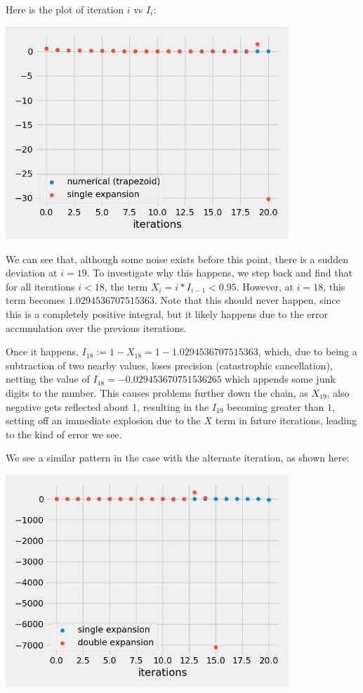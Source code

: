 Here is the plot of iteration $i$ vs $I_i$:

\begin{center}
	\includegraphics*[width=0.8\textwidth]{res/3.3-single.png}
\end{center}

We can see that, although some noise exists before this point, there is a sudden deviation at $i = 19$. To investigate why this happens, we step back and find that for all iterations $i < 18$, the term $X_i = i * I_{i - 1} < 0.95$. However, at $i = 18$, this term becomes $1.0294536707515363$. Note that this should never happen, since this is a completely positive integral, but it likely happens due to the error accumulation over the previous iterations.\bigskip

Once it happens, $I_{18} := 1 - X_{18} = 1 - 1.0294536707515363$, which, due to being a subtraction of two nearby values, loses precision (catastrophic cancellation), netting the value of $I_{18} = -0.029453670751536265$ which appends some junk digits to the number. This causes problems further down the chain, as $X_{19}$, also negative gets reflected about $1$, resulting in the $I_{19}$ becoming greater than $1$, setting off an immediate explosion due to the $X$ term in future iterations, leading to the kind of error we see.\bigskip

We see a similar pattern in the case with the alternate iteration, as shown here:

\begin{center}
	\includegraphics*[width=0.8\textwidth]{res/3.3-double.png}
\end{center}

